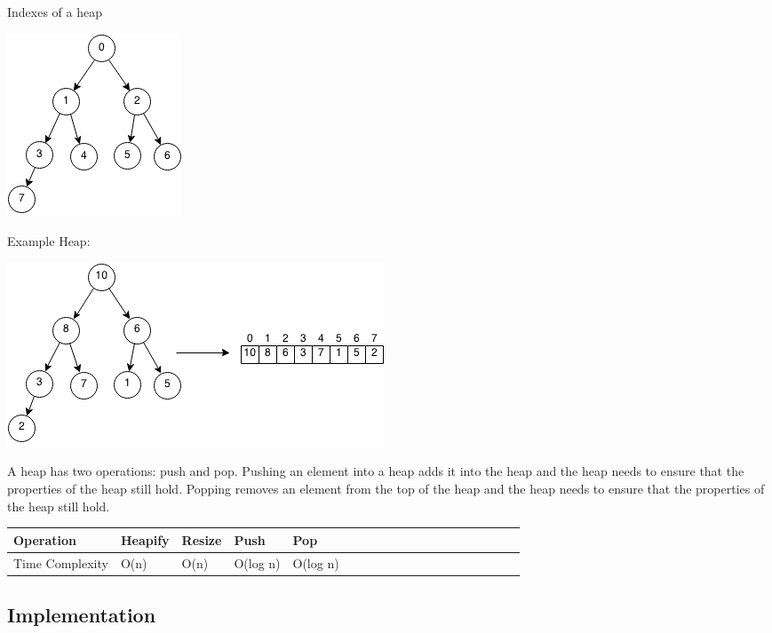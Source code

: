 \documentclass[11pt,oneside]{book}
\makeatletter
\def\maxwidth#1{\ifdim\Gin@nat@width>#1 #1\else\Gin@nat@width\fi}
\makeatother
\begin{document}
Indexes of a heap

\vspace{5px}\includegraphics[width=\maxwidth{\textwidth}]{maxheap2.png}

Example Heap:

\vspace{5px}\includegraphics[width=\maxwidth{\textwidth}]{maxheap.png}

A heap has two operations: push and pop. Pushing an element into a heap adds it into the heap and the heap needs to ensure that the properties of the heap still hold. Popping removes an element from the top of the heap and the heap needs to ensure that the properties of the heap still hold.

\vspace{10px}\begin{tabulary}{0.4\linewidth}{|l|l|l|l|l|l|l|l|l|l|l|l|l|l|l|l|l|l|l}\hline


  Operation &
  Heapify &
  Resize &
  Push &
  Pop\\
\hline


  Time Complexity &
  O(n) &
  O(n) &
  O(log n) &
  O(log n)\\

\hline\end{tabulary}

\subsection{Implementation}
\end{document}
